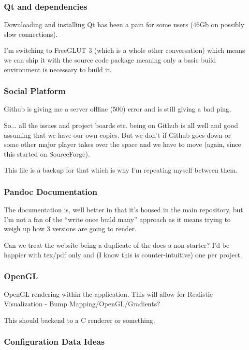 \documentclass[a4paper, 11pt]{report}
\begin{document}
\subsubsection{Qt and dependencies}

Downloading and installing Qt has been a pain for some users
(46Gb on possibly slow connections).

I'm switching to FreeGLUT 3 (which is a whole other conversation) which means we
can ship it with the source code package meaning only a basic build
environment is necessary to build it.

\subsubsection{Social Platform}

Github is giving me a server offline (500) error and is still giving a bad ping.

So... all the issues and project boards etc. being on Github is all well and good assuming that we have our own copies. But we don't if Github goes down or some other major player takes over the space and we have to move (again, since this started on SourceForge).

This file is a backup for that which is why I'm repeating myself between them.

\subsubsection{Pandoc Documentation}

The documentation is, well better in that it's housed in the main repository,
but I'm not a fan of the ``write once build many'' approach as it means
trying to weigh up how 3 versions are going to render.

Can we treat the website being a duplicate of the docs a non-starter?
I'd be happier with tex/pdf only and (I know this is counter-intuitive) one
per project.

\subsubsection{OpenGL}

OpenGL rendering within the application. This will allow for
Realistic Visualization - Bump Mapping/OpenGL/Gradients?

This should backend to a C renderer or something.

\subsubsection{Configuration Data Ideas}
\end{document}
